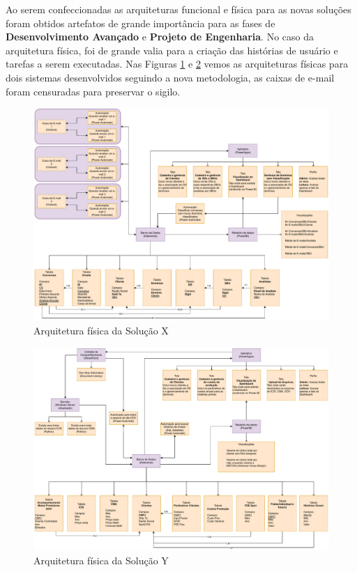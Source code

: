 	Ao serem confeccionadas as arquiteturas funcional e física para as novas soluções foram obtidos artefatos de grande importância para as
	fases de \textbf{Desenvolvimento Avançado} e \textbf{Projeto de Engenharia}. No caso da arquitetura física, foi de grande valia para a criação das
	histórias de usuário e tarefas a serem executadas. Nas Figuras \ref{fig:metodologia:solucaoXArqFis} e \ref{fig:metodologia:solucaoYArqFis} vemos as arquiteturas físicas para dois sistemas desenvolvidos seguindo
	a nova metodologia, as caixas de e-mail foram censuradas para preservar o sigilo.

	\begin{figure}[!h]
		\centering
		\includegraphics[width=1\textwidth]{./figuras/solucaoXArqFis.pdf}
		\caption{Arquitetura física da Solução X}
		\label{fig:metodologia:solucaoXArqFis}
	\end{figure}
	
	\begin{figure}[!h]
		\centering
		\includegraphics[width=1\textwidth]{./figuras/oneStopArqFis.pdf}
		\caption{Arquitetura física da Solução Y}
		\label{fig:metodologia:solucaoYArqFis}
	\end{figure}

